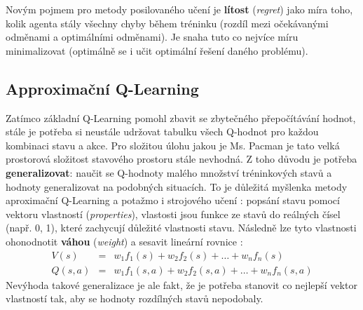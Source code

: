 Novým pojmem pro metody posilovaného učení je \textbf{lítost} (\textit{regret}) jako míra toho, kolik agenta stály všechny chyby během tréninku (rozdíl mezi očekávanými odměnami a optimálními odměnami). Je snaha tuto co nejvíce míru minimalizovat (optimálně se i učit optimální řešení daného problému).

\subsection*{Approximační Q-Learning}
\label{sec:qlearning}
Zatímco základní Q-Learning pomohl zbavit se zbytečného přepočítávání hodnot, stále je potřeba si neustále udržovat tabulku všech Q-hodnot pro každou kombinaci stavu a akce. Pro složitou úlohu jakou je Ms. Pacman je tato velká prostorová složitost stavového prostoru stále nevhodná. Z toho důvodu je potřeba \textbf{generalizovat}: naučit se Q-hodnoty malého množství tréninkových stavů a hodnoty generalizovat na podobných situacích. To je důležitá myšlenka metody aproximační Q-Learning a potažmo i strojového učení \cite{RLAprox}:
\newline
popsání stavu pomocí vektoru vlastností (\textit{properties}), vlastosti jsou funkce ze stavů do reálných čísel (např. 0, 1), které zachycují důležité vlastnosti stavu. Následně lze tyto vlastnosti ohonodnotit \textbf{váhou} (\textit{weight}) a sesavit lineární rovnice \cite{RLAprox}:
\begin{eqnarray}
V(s) &=& w_1f_1(s) + w_2f_2(s) + \dots + w_nf_n(s) \\
Q(s,a) &=& w_1f_1(s,a) + w_2f_2(s,a) + \dots + w_nf_n(s,a)
\end{eqnarray}
Nevýhoda takové generalizace je ale fakt, že je potřeba stanovit co nejlepší vektor vlastností tak, aby se hodnoty rozdílných stavů nepodobaly.
